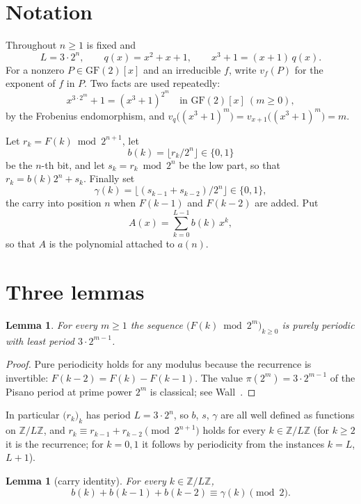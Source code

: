 \documentclass[11pt,a4paper]{article}
\theoremstyle{plain}
\newtheorem{lemma}[theorem]{Lemma}
\theoremstyle{definition}
\begin{document}
\section{Notation}

Throughout $n\ge1$ is fixed and
\[
  L=3\cdot2^{n},\qquad q(x)=x^{2}+x+1,\qquad x^{3}+1=(x+1)\,q(x).
\]
For a nonzero $P\in\mathrm{GF}(2)[x]$ and an irreducible $f$, write $v_{f}(P)$ for the
exponent of $f$ in $P$. Two facts are used repeatedly:
\begin{equation}\label{eq:frob}
  x^{3\cdot2^{m}}+1=(x^{3}+1)^{2^{m}}\quad\text{in }\mathrm{GF}(2)[x]\ (m\ge0),
\end{equation}
by the Frobenius endomorphism, and
$v_{q}\bigl((x^{3}+1)^{m}\bigr)=v_{x+1}\bigl((x^{3}+1)^{m}\bigr)=m$.

Let $r_{k}=F(k)\bmod2^{n+1}$, let
\[
  b(k)=\bigl\lfloor r_{k}/2^{n}\bigr\rfloor\in\{0,1\}
\]
be the $n$-th bit, and let $s_{k}=r_{k}\bmod2^{n}$ be the low part, so that
$r_{k}=b(k)2^{n}+s_{k}$. Finally set
\[
  \gamma(k)=\bigl\lfloor(s_{k-1}+s_{k-2})/2^{n}\bigr\rfloor\in\{0,1\},
\]
the carry into position $n$ when $F(k-1)$ and $F(k-2)$ are added. Put
\[
  A(x)=\sum_{k=0}^{L-1}b(k)\,x^{k},
\]
so that $A$ is the polynomial attached to $a(n)$.

\section{Three lemmas}

\begin{lemma}\label{lem:pisano}
For every $m\ge1$ the sequence $\bigl(F(k)\bmod2^{m}\bigr)_{k\ge0}$ is purely periodic with
least period $3\cdot2^{m-1}$.
\end{lemma}

\begin{proof}
Pure periodicity holds for any modulus because the recurrence is invertible:
$F(k-2)=F(k)-F(k-1)$. The value $\pi(2^{m})=3\cdot2^{m-1}$ of the Pisano period at prime
power $2^{m}$ is classical; see Wall~\cite{wall}.
\end{proof}

In particular $\bigl(r_{k}\bigr)_{k}$ has period $L=3\cdot2^{n}$, so $b$, $s$, $\gamma$ are
all well defined as functions on $\mathbb{Z}/L\mathbb{Z}$, and
$r_{k}\equiv r_{k-1}+r_{k-2}\pmod{2^{n+1}}$ holds for every
$k\in\mathbb{Z}/L\mathbb{Z}$ (for $k\ge2$ it is the recurrence; for $k=0,1$ it follows by
periodicity from the instances $k=L$, $L+1$).

\begin{lemma}[carry identity]\label{lem:carry}
For every $k\in\mathbb{Z}/L\mathbb{Z}$,
\[
  b(k)+b(k-1)+b(k-2)\equiv\gamma(k)\pmod2.
\]
\end{lemma}
\end{document}
